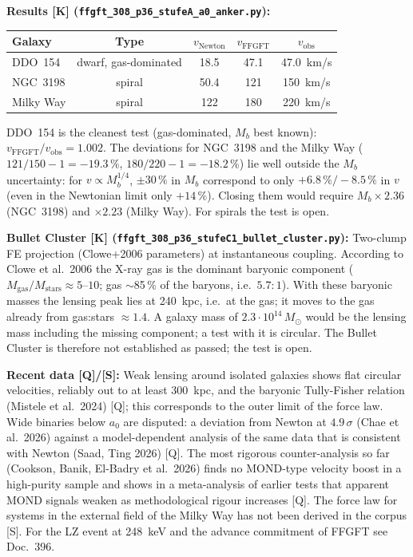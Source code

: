 \textbf{Results [K]
(\texttt{ffgft\_308\_p36\_stufeA\_a0\_anker.py}):}

\begin{center}
\begin{tabular}{lcccc}
\toprule
Galaxy & Type & $v_\text{Newton}$ & $v_\text{FFGFT}$ & $v_\text{obs}$ \\
\midrule
DDO~154    & dwarf, gas-dominated & 18.5 & 47.1 & 47.0~km/s \\
NGC~3198   & spiral               & 50.4 & 121  & 150~km/s \\
Milky Way  & spiral               & 122  & 180  & 220~km/s \\
\bottomrule
\end{tabular}
\end{center}

DDO~154 is the cleanest test (gas-dominated, $M_b$ best known):
$v_\text{FFGFT}/v_\text{obs} = 1.002$. The deviations for NGC~3198 and the
Milky Way ($121/150 - 1 = -19.3\,\%$, $180/220 - 1 = -18.2\,\%$) lie well
outside the $M_b$ uncertainty: for $v \propto M_b^{1/4}$, $\pm30\,\%$ in $M_b$
correspond to only $+6.8\,\%/-8.5\,\%$ in $v$ (even in the Newtonian limit
only $+14\,\%$). Closing them would require $M_b \times 2.36$ (NGC~3198) and
$\times 2.23$ (Milky Way). For spirals the test is open.

\textbf{Bullet Cluster [K]
(\texttt{ffgft\_308\_p36\_stufeC1\_bullet\_cluster.py}):}
Two-clump FE projection (Clowe+2006 parameters) at instantaneous coupling.
According to Clowe et al.\ 2006 the X-ray gas is the dominant baryonic
component ($M_\text{gas}/M_\text{stars} \approx 5$--$10$; gas $\sim$85\,\% of
the baryons, i.e.\ $5.7:1$). With these baryonic masses the lensing peak lies
at 240~kpc, i.e.\ at the gas; it moves to the gas already from
gas:stars $\approx 1.4$. A galaxy mass of $2.3\cdot10^{14}\,M_\odot$ would be
the lensing mass including the missing component; a test with it is
circular. The Bullet Cluster is therefore not established as passed; the
test is open.

\textbf{Recent data [Q]/[S]:} Weak lensing around isolated galaxies shows
flat circular velocities, reliably out to at least 300~kpc, and the
baryonic Tully-Fisher relation (Mistele et al.\ 2024) [Q]; this corresponds
to the outer limit of the force law. Wide binaries below $a_0$ are
disputed: a deviation from Newton at $4.9\,\sigma$ (Chae et al.\ 2026)
against a model-dependent analysis of the same data that is consistent
with Newton (Saad, Ting 2026) [Q]. The most rigorous counter-analysis so
far (Cookson, Banik, El-Badry et al.\ 2026) finds no MOND-type velocity
boost in a high-purity sample and shows in a meta-analysis of earlier tests
that apparent MOND signals weaken as methodological rigour increases [Q].
The force law for systems in the
external field of the Milky Way has not been derived in the corpus [S].
For the LZ event at 248~keV and the advance commitment of FFGFT see
Doc.~396.

